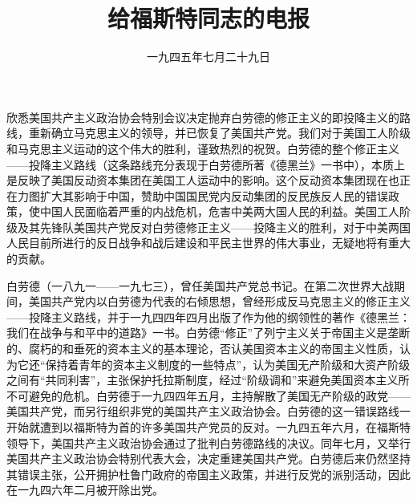 
\title{给福斯特同志的电报}
\date{一九四五年七月二十九日}
\maketitle



欣悉美国共产主义政治协会特别会议决定抛弃白劳德的修正主义的即投降主义的路线，重新确立马克思主义的领导，并已恢复了美国共产党。我们对于美国工人阶级和马克思主义运动的这个伟大的胜利，谨致热烈的祝贺。白劳德的整个修正主义——投降主义路线（这条路线充分表现于白劳德所著《德黑兰》一书中），本质上是反映了美国反动资本集团在美国工人运动中的影响。这个反动资本集团现在也正在力图扩大其影响于中国，赞助中国国民党内反动集团的反民族反人民的错误政策，使中国人民面临着严重的内战危机，危害中美两大国人民的利益。美国工人阶级及其先锋队美国共产党反对白劳德修正主义——投降主义的胜利，对于中美两国人民目前所进行的反日战争和战后建设和平民主世界的伟大事业，无疑地将有重大的贡献。


\begin{maonote}
白劳德（一八九一——一九七三），曾任美国共产党总书记。在第二次世界大战期间，美国共产党内以白劳德为代表的右倾思想，曾经形成反马克思主义的修正主义——投降主义路线，并于一九四四年四月出版了作为他的纲领性的著作《德黑兰：我们在战争与和平中的道路》一书。白劳德“修正”了列宁主义关于帝国主义是垄断的、腐朽的和垂死的资本主义的基本理论，否认美国资本主义的帝国主义性质，认为它还“保持着青年的资本主义制度的一些特点”，认为美国无产阶级和大资产阶级之间有“共同利害”，主张保护托拉斯制度，经过“阶级调和”来避免美国资本主义所不可避免的危机。白劳德于一九四四年五月，主持解散了美国无产阶级的政党——美国共产党，而另行组织非党的美国共产主义政治协会。白劳德的这一错误路线一开始就遭到以福斯特为首的许多美国共产党员的反对。一九四五年六月，在福斯特领导下，美国共产主义政治协会通过了批判白劳德路线的决议。同年七月，又举行美国共产主义政治协会特别代表大会，决定重建美国共产党。白劳德后来仍然坚持其错误主张，公开拥护杜鲁门政府的帝国主义政策，并进行反党的派别活动，因此在一九四六年二月被开除出党。
\end{maonote}
